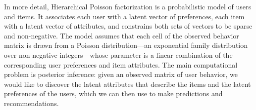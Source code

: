 


In more detail, Hierarchical Poisson factorization is a probabilistic
model of users and items.  It associates each user with a latent
vector of preferences, each item with a latent vector of attributes,
and constrains both sets of vectors to be sparse and non-negative. The
model assumes that each cell of the observed behavior matrix is drawn
from a Poisson distribution---an exponential family distribution over
non-negative integers---whose parameter is a linear combination of the
corresponding user preferences and item attributes.  The main
computational problem is posterior inference: given an observed matrix
of user behavior, we would like to discover the latent attributes that
describe the items and the latent preferences of the users, which we
can then use to make predictions and recommendations.

